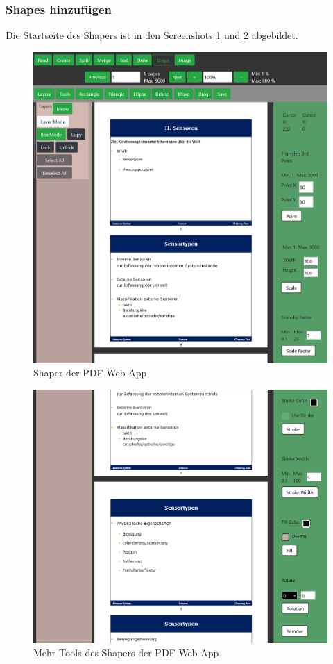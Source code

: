 \subsubsection{Shapes hinzufügen}
Die Startseite des Shapers ist in den Screenshots \ref{fig:shaper} und \ref{fig:shaper2} abgebildet. 

\begin{figure}[!htbp]
	\centering
	\includegraphics[width=1\textwidth]{"images/shaper.png"}
	\caption{Shaper der PDF Web App}
	\label{fig:shaper}
\end{figure}

\begin{figure}[!htbp]
	\centering
	\includegraphics[width=1\textwidth]{"images/shaper2.png"}
	\caption{Mehr Tools des Shapers der PDF Web App}
	\label{fig:shaper2}
\end{figure}


